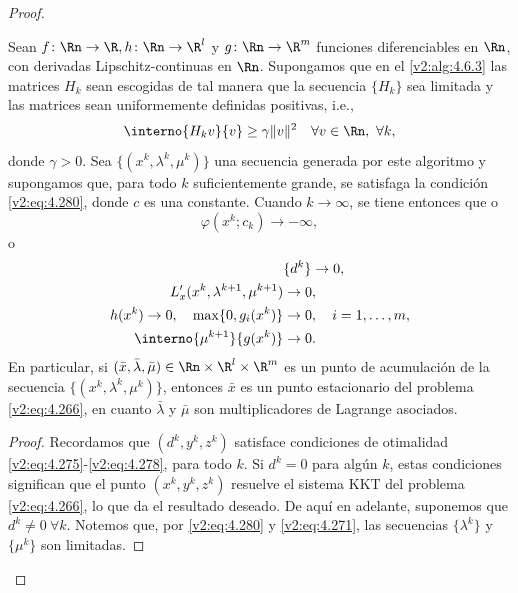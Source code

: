 \begin{proof}
\begin{theorem}\label{v2:thm:4.6.3}
Sean $f \colon \Rn \to \R, h \colon \Rn \to \R^l$ y $g \colon \Rn \to \R^m$ funciones diferenciables en $\Rn$, con derivadas Lipschitz-continuas en $\Rn$. Supongamos que en el \cref{v2:alg:4.6.3} las matrices $H_k$ sean escogidas de tal manera que la secuencia $\{H_k\}$ sea limitada y las matrices sean uniformemente definidas positivas, i.e.,
\begin{equation}
\interno{H_k v}{v} \ge \gamma \|v\|^2 \quad \forall v \in \Rn, \ \forall k,
\label{v2:eq:4.281}
\end{equation}
donde $\gamma > 0$. Sea $\{(x^k, \lambda^k, \mu^k)\}$ una secuencia generada por este algoritmo y supongamos que, para todo $k$ suficientemente grande, se satisfaga la condición \eqref{v2:eq:4.280}, donde $c$ es una constante.
Cuando $k \to \infty$, se tiene entonces que o
\begin{equation}
\varphi(x^k; c_k) \to -\infty,
\label{v2:eq:4.282}
\end{equation}
o
\begin{align*}
&\{d^k\} \to 0, \\
L'_x(x^k, \lambda^{k+1}, \mu^{k+1}) &\to 0, \\
h(x^k) \to 0, \quad \max\{0, g_i(x^k)\} &\to 0, \quad i = 1, \dots, m, \\
\interno{\mu^{k+1}}{g(x^k)} &\to 0.
\end{align*}
En particular, si $(\bar{x}, \bar{\lambda}, \bar{\mu}) \in \Rn \times \R^l \times \R^m$ es un punto de acumulación de la secuencia $\{(x^k, \lambda^k, \mu^k)\}$, entonces $\bar{x}$ es un punto estacionario del problema \eqref{v2:eq:4.266}, en cuanto $\bar{\lambda}$ y $\bar{\mu}$ son multiplicadores de Lagrange asociados.
\end{theorem}

\begin{proof}
Recordamos que $(d^k, y^k, z^k)$ satisface condiciones de otimalidad \eqref{v2:eq:4.275}-\eqref{v2:eq:4.278}, para todo $k$. Si $d^k = 0$ para algún $k$, estas condiciones significan que el punto $(x^k, y^k, z^k)$ resuelve el sistema KKT del problema \eqref{v2:eq:4.266}, lo que da el resultado deseado. De aquí en adelante, suponemos que $d^k \neq 0 \ \forall k$. Notemos que, por \eqref{v2:eq:4.280} y \eqref{v2:eq:4.271}, las secuencias $\{\lambda^k\}$ y $\{\mu^k\}$ son limitadas.


\end{proof}
\end{proof}
